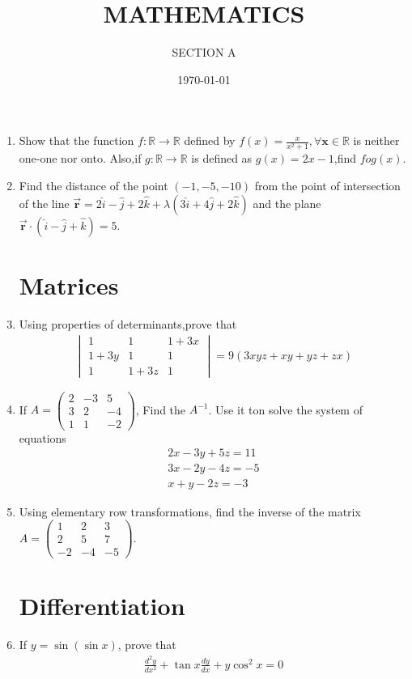 \documentclass[10pt,-letter paper]{article}
\title{MATHEMATICS}
\author{SECTION A}
\date{\today}
\providecommand{\brak}[1]{\ensuremath{\left(#1\right)}}
\newcommand{\myvec}[1]{\ensuremath{\begin{pmatrix}#1\end{pmatrix}}}
\newcommand{\mydet}[1]{\ensuremath{\begin{vmatrix}#1\end{vmatrix}}}
\begin{document}
\maketitle
\begin{enumerate}
\section{Vectors}
\item Show that the function $f:\mathbb{R}\rightarrow \mathbb{R}$ defined by $f\brak{x} = \frac{x}{x^{2}+1}, \forall \mathbf{x}\in \mathbb{R}$ is neither one-one nor onto. Also,if $g:\mathbb{R} \rightarrow \mathbb{R}$ is defined as $g\brak{x}=2x-1$,find $fog\brak{x}$.
\item  Find the distance of the point \brak{-1,-5,-10} from the point of intersection of the line $\overrightarrow{\mathbf{r}}=2\hat{i}-\hat{j}+2\hat{k} + \lambda\brak{3\hat{i}+4\hat{j}+2\hat{k}}$ and the plane $\overrightarrow{\mathbf{r}}\cdot\brak{\hat{i}-\hat{j}+\hat{k}}=5$.
\section{Matrices}
\item Using properties of determinants,prove that 
	\begin{align*}
		\mydet{1 & 1 & 1+3x \\ 1+3y & 1 & 1 \\ 1 & 1+3z & 1 }=9\brak{3xyz+xy+yz+zx}
	\end{align*}
\item If $A=\myvec{2 & -3 & 5 \\ 3 & 2 & -4 \\ 1 & 1 & -2}$, Find the $A^{-1}$. Use it ton solve the system of equations 
	\begin{align*}
		2x-3y+5z=11 \\
		3x-2y-4z=-5\\
		x+y-2z=-3
	\end{align*}
\item Using elementary row transformations, find the inverse of the matrix $A=\myvec{1 & 2 & 3 \\ 2 & 5 & 7 \\ -2 & -4 & -5}$.


   \section{Differentiation}
 \item If $y=\sin\brak{\sin x}$, prove that 
		\begin{align*}
			\frac{d^{2}y}{dx^{2}}+\tan x \frac{dy}{dx}+y\cos^{2}x=0
		\end{align*}
	

\end{enumerate}
\end{document}
